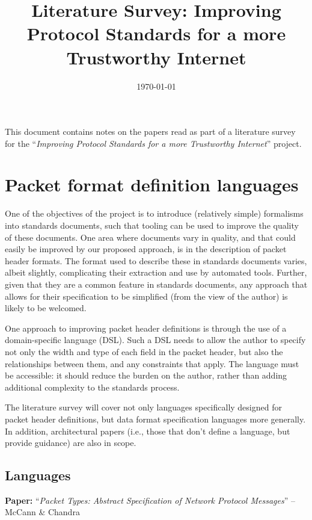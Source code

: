 \documentclass[10pt]{article}
\title{Literature Survey: Improving Protocol Standards for a more Trustworthy Internet}
\date{\today}
\newcommand{\paper}[3]{\vspace{4mm}\noindent\textbf{Paper:} ``\textit{#1}'' -- #2 \cite{#3}\vspace{3mm}}
\begin{document}
\maketitle

This document contains notes on the papers read as part of a literature survey for the
``\textit{Improving Protocol Standards for a more Trustworthy Internet}'' project.


\section{Packet format definition languages}

One of the objectives of the project is to introduce (relatively simple) formalisms into
standards documents, such that tooling can be used to improve the quality of these
documents. One area where documents vary in quality, and that could easily be
improved by our proposed approach, is in the description of packet header formats. The
format used to describe these in standards documents varies, albeit slightly, complicating
their extraction and use by automated tools. Further, given that they are a common feature
in standards documents, any approach that allows for their specification to be simplified
(from the view of the author) is likely to be welcomed.

One approach to improving packet header definitions is through the use of a
domain-specific language (DSL). Such a DSL needs to allow the author to specify not only
the width and type of each field in the packet header, but also the relationships between
them, and any constraints that apply. The language must be accessible: it should reduce
the burden on the author, rather than adding additional complexity to the standards 
process.

The literature survey will cover not only languages specifically designed for packet
header definitions, but data format specification languages more generally. In addition,
architectural papers (i.e., those that don't define a language, but provide guidance) are
also in scope.

\subsection{Languages}

\paper{Packet Types: Abstract Specification of Network Protocol Messages}{McCann \& Chandra}{mccann2000packet}
\end{document}
